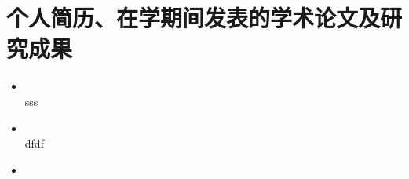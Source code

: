 ﻿%
\chapter*{个人简历、在学期间发表的学术论文及研究成果}
\vskip1.5cm
\begin{itemize}
\item
     {}\\
sss
\item
    {}\\
dfdf
\item
    {}

\end{itemize}